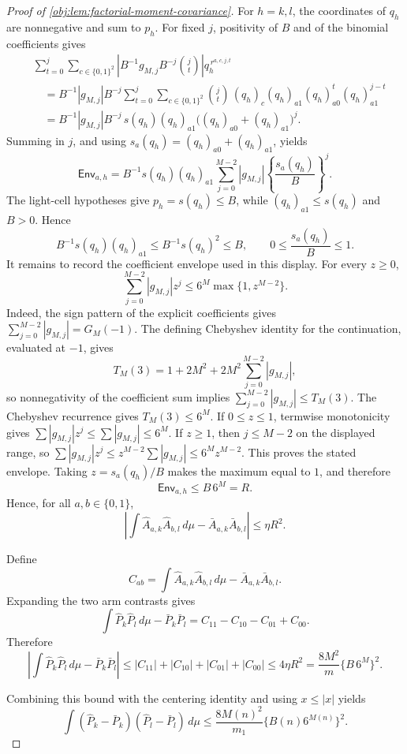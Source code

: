 \begin{proof}[Proof of \cref{obj:lem:factorial-moment-covariance}]
For \(h=k,l\), the coordinates of \(q_h\) are nonnegative and sum to \(p_h\).  For fixed
\(j\), positivity of \(B\) and of the binomial coefficients gives
\[
\begin{aligned}
&\sum_{t=0}^{j}\sum_{c\in\{0,1\}^2}
\left|B^{-1}g_{M,j}B^{-j}\binom jt\right|q_h^{\,r^{a,c,j,t}} \\
&\quad=
B^{-1}|g_{M,j}|B^{-j}
\sum_{t=0}^{j}\sum_{c\in\{0,1\}^2}
\binom jt\,(q_h)_c(q_h)_{a1}(q_h)_{a0}^{t}(q_h)_{a1}^{j-t} \\
&\quad=
B^{-1}|g_{M,j}|B^{-j}
\,s(q_h)(q_h)_{a1}\bigl((q_h)_{a0}+(q_h)_{a1}\bigr)^j.
\end{aligned}
\]
Summing in \(j\), and using \(s_a(q_h)=(q_h)_{a0}+(q_h)_{a1}\), yields
\[
\mathsf{Env}_{a,h}
=
B^{-1}s(q_h)(q_h)_{a1}
\sum_{j=0}^{M-2}|g_{M,j}|\left\{\frac{s_a(q_h)}{B}\right\}^{j}.
\]
The light-cell hypotheses give \(p_h=s(q_h)\le B\), while \((q_h)_{a1}\le s(q_h)\) and
\(B>0\).  Hence
\[
B^{-1}s(q_h)(q_h)_{a1}\le B^{-1}s(q_h)^2\le B,
\qquad
0\le \frac{s_a(q_h)}{B}\le1.
\]
It remains to record the coefficient envelope used in this display.  For every \(z\ge0\),
\[
\sum_{j=0}^{M-2}|g_{M,j}|z^j
\le
6^M\max\{1,z^{M-2}\}.
\]
Indeed, the sign pattern of the explicit coefficients gives
\(\sum_{j=0}^{M-2}|g_{M,j}|=G_M(-1)\).  The defining Chebyshev identity for the continuation,
evaluated at \(-1\), gives
\[
T_M(3)=1+2M^2+2M^2\sum_{j=0}^{M-2}|g_{M,j}|,
\]
so nonnegativity of the coefficient sum implies
\(\sum_{j=0}^{M-2}|g_{M,j}|\le T_M(3)\).  The Chebyshev recurrence gives
\(T_M(3)\le6^M\).  If \(0\le z\le1\), termwise monotonicity gives
\(\sum |g_{M,j}|z^j\le\sum |g_{M,j}|\le6^M\).  If \(z\ge1\), then
\(j\le M-2\) on the displayed range, so
\(\sum |g_{M,j}|z^j\le z^{M-2}\sum |g_{M,j}|\le6^M z^{M-2}\).  This proves the stated
envelope.  Taking \(z=s_a(q_h)/B\) makes the maximum equal to \(1\), and therefore
\[
\mathsf{Env}_{a,h}\le B\,6^M=R.
\]
Hence, for all \(a,b\in\{0,1\}\),
\[
\left|
\int \widehat A_{a,k}\widehat A_{b,l}\,d\mu-
\bar A_{a,k}\bar A_{b,l}
\right|
\le \eta R^2 .
\]

Define
\[
C_{ab}
=
\int \widehat A_{a,k}\widehat A_{b,l}\,d\mu-
\bar A_{a,k}\bar A_{b,l}.
\]
Expanding the two arm contrasts gives
\[
\int \widehat P_k\widehat P_l\,d\mu-
\bar P_k\bar P_l
=
C_{11}-C_{10}-C_{01}+C_{00}.
\]
Therefore
\[
\left|
\int \widehat P_k\widehat P_l\,d\mu-
\bar P_k\bar P_l
\right|
\le
|C_{11}|+|C_{10}|+|C_{01}|+|C_{00}|
\le 4\eta R^2
=
\frac{8M^2}{m}\{B\,6^M\}^2 .
\]

Combining this bound with the centering identity and using \(x\le |x|\) yields
\[
\int(\widehat P_k-\bar P_k)(\widehat P_l-\bar P_l)\,d\mu
\le
\frac{8M(n)^2}{m_1}\{B(n)6^{M(n)}\}^2 .
\]
\end{proof}
